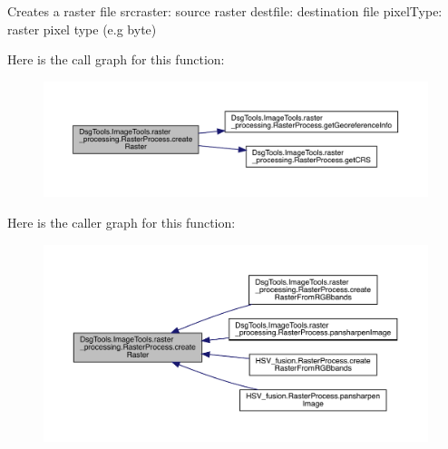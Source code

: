 \begin{DoxyVerb}Creates a raster file
srcraster: source raster
destfile: destination file
pixelType: raster pixel type (e.g byte)
\end{DoxyVerb}
 Here is the call graph for this function\+:
\nopagebreak
\begin{figure}[H]
\begin{center}
\leavevmode
\includegraphics[width=350pt]{class_dsg_tools_1_1_image_tools_1_1raster__processing_1_1_raster_process_ae0baa21e8ad949a1b32a7b5009cdda5b_cgraph}
\end{center}
\end{figure}
Here is the caller graph for this function\+:
\nopagebreak
\begin{figure}[H]
\begin{center}
\leavevmode
\includegraphics[width=350pt]{class_dsg_tools_1_1_image_tools_1_1raster__processing_1_1_raster_process_ae0baa21e8ad949a1b32a7b5009cdda5b_icgraph}
\end{center}
\end{figure}
\mbox{\label{class_dsg_tools_1_1_image_tools_1_1raster__processing_1_1_raster_process_af334cdc5aa7d11ee74e1cc97b3007abf}} 
